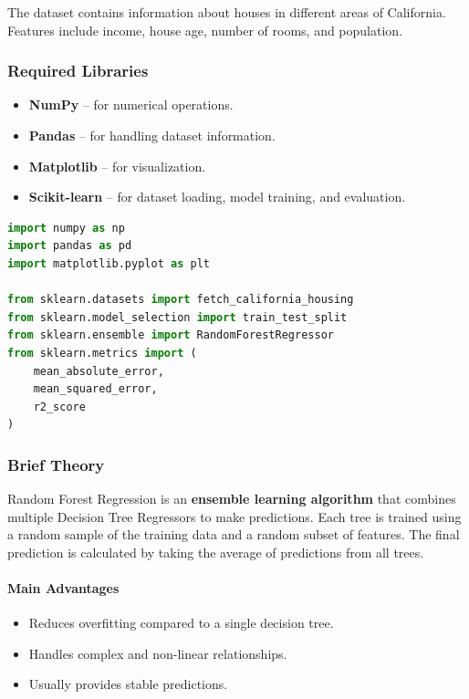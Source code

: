 \documentclass[a4paper,11pt]{article}
\begin{document}
The dataset contains information about houses in different areas of California. Features include income, house age, number of rooms, and population.

\subsubsection{Required Libraries}
\begin{itemize}
    \item \textbf{NumPy} -- for numerical operations.
    \item \textbf{Pandas} -- for handling dataset information.
    \item \textbf{Matplotlib} -- for visualization.
    \item \textbf{Scikit-learn} -- for dataset loading, model training, and evaluation.
\end{itemize}

\begin{lstlisting}[language=Python, caption={Required Imports}]
import numpy as np
import pandas as pd
import matplotlib.pyplot as plt

from sklearn.datasets import fetch_california_housing
from sklearn.model_selection import train_test_split
from sklearn.ensemble import RandomForestRegressor
from sklearn.metrics import (
    mean_absolute_error,
    mean_squared_error,
    r2_score
)
\end{lstlisting}

\subsubsection{Brief Theory}
Random Forest Regression is an \textbf{ensemble learning algorithm} that combines multiple Decision Tree Regressors to make predictions. Each tree is trained using a random sample of the training data and a random subset of features. The final prediction is calculated by taking the average of predictions from all trees.

\paragraph{Main Advantages}
\begin{itemize}
    \item Reduces overfitting compared to a single decision tree.
    \item Handles complex and non-linear relationships.
    \item Usually provides stable predictions.
\end{itemize}
\end{document}
